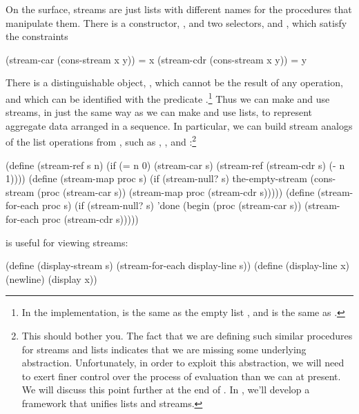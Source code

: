 On the surface, streams are just lists with different names for the procedures
that manipulate them.  There is a constructor, , and two
selectors,  and , which satisfy the
constraints

\begin{codeBlock}
(stream-car (cons-stream x y)) = x
(stream-cdr (cons-stream x y)) = y
\end{codeBlock}

\noindent
There is a distinguishable object, , which cannot be the
result of any  operation, and which can be identified with
the predicate .\footnote{In the 
implementation,  is the same as the empty list
, and  is the same as .}  Thus we can
make and use streams, in just the same way as we can make and use lists, to
represent aggregate data arranged in a sequence.  In particular, we can build
stream analogs of the list operations from , such as
, , and :\footnote{This should bother
you.  The fact that we are defining such similar procedures for streams and
lists indicates that we are missing some underlying abstraction.
Unfortunately, in order to exploit this abstraction, we will need to exert
finer control over the process of evaluation than we can at present.  We will
discuss this point further at the end of .  In
, we'll develop a framework that unifies lists and streams.}

\begin{codeBlock}
(define (stream-ref s n)
  (if (= n 0)
      (stream-car s)
      (stream-ref (stream-cdr s) (- n 1))))
(define (stream-map proc s)
  (if (stream-null? s)
      the-empty-stream
      (cons-stream (proc (stream-car s))
                   (stream-map proc (stream-cdr s)))))
(define (stream-for-each proc s)
  (if (stream-null? s)
      'done
      (begin (proc (stream-car s))
             (stream-for-each proc (stream-cdr s)))))
\end{codeBlock}

\noindent
{} is useful for viewing streams:

\begin{codeBlock}
(define (display-stream s)
  (stream-for-each display-line s))
(define (display-line x) (newline) (display x))
\end{codeBlock}

